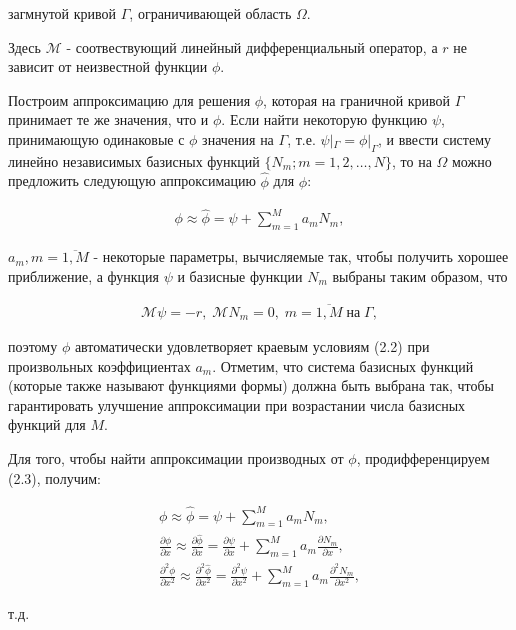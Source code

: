 \documentclass[14pt]{extreport}
\begin{document}
 загмнутой кривой $\Gamma$, ограничивающей область $\Omega$.

Здесь $\mathcal M$ - соотвествующий линейный дифференциальный оператор, а $r$ не зависит от неизвестной функции $\phi$.

Построим аппроксимацию для решения $\phi$, которая на граничной кривой $\Gamma$ принимает те же значения, что и $\phi$. Если найти некоторую функцию $\psi$, принимающую одинаковые с $\phi$ значения на $\Gamma$, т.е. $\psi|_\Gamma= \phi|_\Gamma$, и ввести систему линейно независимых базисных функций $\{N_m; m = 1,2, \dots, N\}$, то на $\Omega$ можно предложить следующую аппроксимацию $\hat{\phi}$ для $\phi$: 

\begin{eqnarray}
\phi \approx \hat\phi = \psi + \sum\limits_{m=1}^{M} a_mN_m,
\end{eqnarray}

 $a_m, m= \overline{1,M}$ - некоторые параметры, вычисляемые так, чтобы получить хорошее приближение, а функция $\psi$ и базисные функции $N_m$ выбраны таким образом, что

\begin{eqnarray}
 \mathcal M\psi=-r, \; \mathcal M N_m=0, \; m=\overline{1,M} \; \text{на} \; \Gamma,
\end{eqnarray}

 поэтому $\phi$ автоматически удовлетворяет краевым условиям (2.2) при произвольных коэффициентах $a_m$. Отметим, что система базисных функций (которые также называют функциями формы) должна быть выбрана так, чтобы гарантировать улучшение аппроксимации при возрастании числа базисных функций для $M$.

Для того, чтобы найти аппроксимации производных от $\phi$, продифференцируем (2.3), получим:


\begin{gather}
\phi \approx \hat\phi = \psi + \sum\limits_{m=1}^{M} a_mN_m,\nonumber\\
\frac{\partial \phi}{\partial x} \approx \frac{\partial \hat\phi}{\partial x}=\frac{\partial \psi}{\partial x}+\sum\limits_{m=1}^{M} a_m\frac{\partial N_m}{\partial x},\nonumber\\
\frac{\partial^2 \phi}{\partial x^2} \approx \frac{\partial^2 \hat\phi}{\partial x^2}=\frac{\partial^2 \psi}{\partial x^2}+\sum\limits_{m=1}^{M} a_m\frac{\partial^2 N_m}{\partial x^2}, \nonumber
\end{gather}

 т.д.
\end{document}
